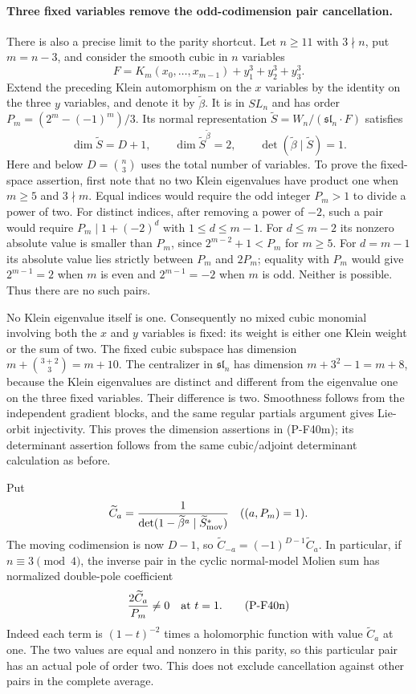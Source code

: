 \paragraph{Three fixed variables remove the odd-codimension pair cancellation.}
There is also a precise limit to the parity shortcut. Let
$n\ge11$ with $3\nmid n$, put $m=n-3$, and consider the smooth
cubic in $n$ variables
\[
             F=K_m(x_0,\ldots,x_{m-1})+y_1^3+y_2^3+y_3^3.
 \tag{P-F40l}
\]
Extend the preceding Klein automorphism on the $x$ variables by
the identity on the three $y$ variables, and denote it by
$\widetilde\beta$. It is in $SL_n$ and has order
$P_m=(2^m-(-1)^m)/3$. Its normal representation
$\widetilde S=W_n/(\mathfrak{sl}_n\cdot F)$ satisfies
\[
 \dim\widetilde S=D+1,\qquad
 \dim\widetilde S^{\widetilde\beta}=2,
 \qquad \det(\widetilde\beta\mid\widetilde S)=1.
 \tag{P-F40m}
\]
Here and below $D=\binom n3$ uses the total number of variables.
To prove the fixed-space assertion, first note that no two
Klein eigenvalues have product one when $m\ge5$ and $3\nmid m$.
Equal indices would require the odd integer $P_m>1$ to divide
a power of two. For distinct indices, after removing a power
of $-2$, such a pair would require
$P_m\mid1+(-2)^d$ with $1\le d\le m-1$.
For $d\le m-2$ its nonzero absolute value is smaller than
$P_m$, since $2^{m-2}+1<P_m$ for $m\ge5$.
For $d=m-1$ its absolute value lies strictly between
$P_m$ and $2P_m$; equality with $P_m$ would give
$2^{m-1}=2$ when $m$ is even and $2^{m-1}=-2$ when $m$
is odd. Neither is possible. Thus there are no such pairs.

No Klein eigenvalue itself is one. Consequently no mixed
cubic monomial involving both the $x$ and $y$ variables is
fixed: its weight is either one Klein weight or the sum of
two. The fixed cubic subspace has dimension
$m+\binom{3+2}{3}=m+10$.
The centralizer in $\mathfrak{sl}_n$ has dimension
$m+3^2-1=m+8$, because the Klein eigenvalues are distinct
and different from the eigenvalue one on the three fixed
variables. Their difference is two. Smoothness follows
from the independent gradient blocks, and the same regular
partials argument gives Lie-orbit injectivity. This proves
the dimension assertions in (P-F40m); its determinant
assertion follows from the same cubic/adjoint determinant
calculation as before.

Put
\[
 \widetilde C_a=
 \frac1{\det(1-\widetilde\beta^a\mid
                         \widetilde S^*_{\rm mov})}
                \quad((a,P_m)=1).
\]
The moving codimension is now $D-1$, so
$\widetilde C_{-a}=(-1)^{D-1}\widetilde C_a$.
In particular, if $n\equiv3\pmod4$, the inverse pair in the
cyclic normal-model Molien sum has normalized double-pole
coefficient
\[
                    \frac{2\widetilde C_a}{P_m}\ne0
                    \quad\hbox{at }t=1.
 \tag{P-F40n}
\]
Indeed each term is $(1-t)^{-2}$ times a holomorphic function
with value $\widetilde C_a$ at one. The two values are equal
and nonzero in this parity, so this particular pair has an
actual pole of order two. This does not exclude cancellation
against other pairs in the complete average.

